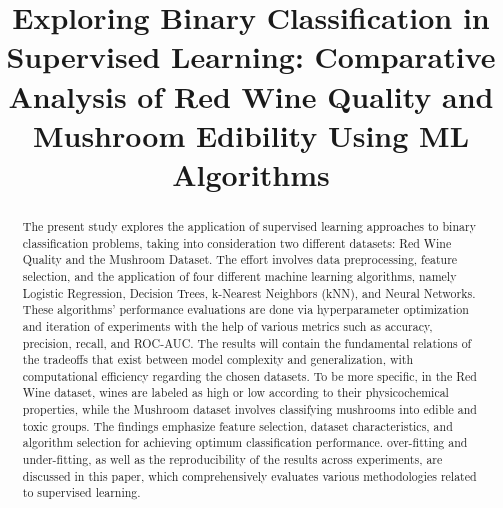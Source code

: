 \documentclass[conference]{IEEEtran}
\begin{document}
\title{Exploring Binary Classification in Supervised Learning: Comparative Analysis of Red Wine Quality and Mushroom Edibility Using ML Algorithms}

\author{
\and
{}
\and
{}
\and
{}
}

\maketitle

\begin{abstract}
  The present study explores the application of supervised learning approaches to binary classification problems, taking into consideration two different datasets: Red Wine Quality and the Mushroom Dataset. The effort involves data preprocessing, feature selection, and the application of four different machine learning algorithms, namely Logistic Regression, Decision Trees, k-Nearest Neighbors (kNN), and Neural Networks. These algorithms' performance evaluations are done via hyperparameter optimization and iteration of experiments with the help of various metrics such as accuracy, precision, recall, and ROC-AUC. The results will contain the fundamental relations of the tradeoffs that exist between model complexity and generalization, with computational efficiency regarding the chosen datasets. To be more specific, in the Red Wine dataset, wines are labeled as high or low according to their physicochemical properties, while the Mushroom dataset involves classifying mushrooms into edible and toxic groups. The findings emphasize feature selection, dataset characteristics, and algorithm selection for achieving optimum classification performance. over-fitting and under-fitting, as well as the reproducibility of the results across experiments, are discussed in this paper, which comprehensively evaluates various methodologies related to supervised learning.
\end{abstract}
\end{document}

